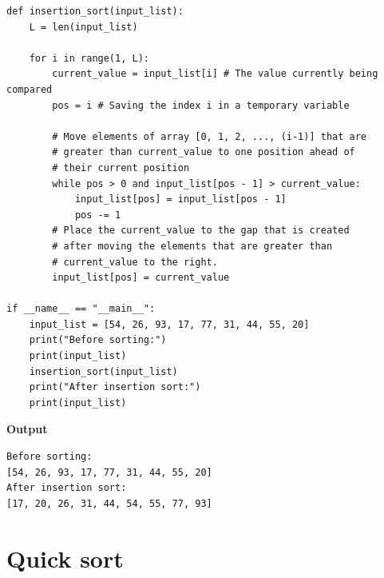 \documentclass[a4paper,11pt]{book}
\begin{document}
\newpage
\begin{lstlisting}
def insertion_sort(input_list):
    L = len(input_list)
    
    for i in range(1, L):
        current_value = input_list[i] # The value currently being compared
        pos = i # Saving the index i in a temporary variable
        
        # Move elements of array [0, 1, 2, ..., (i-1)] that are 
        # greater than current_value to one position ahead of 
        # their current position
        while pos > 0 and input_list[pos - 1] > current_value:
            input_list[pos] = input_list[pos - 1]
            pos -= 1
        # Place the current_value to the gap that is created 
        # after moving the elements that are greater than 
        # current_value to the right.
        input_list[pos] = current_value

if __name__ == "__main__": 
    input_list = [54, 26, 93, 17, 77, 31, 44, 55, 20]
    print("Before sorting:")
    print(input_list)
    insertion_sort(input_list)
    print("After insertion sort:")
    print(input_list)
\end{lstlisting}
\textbf{Output}
\begin{lstlisting}
Before sorting:
[54, 26, 93, 17, 77, 31, 44, 55, 20]
After insertion sort:
[17, 20, 26, 31, 44, 54, 55, 77, 93]
\end{lstlisting}

\newpage
\section{Quick sort}
\end{document}
